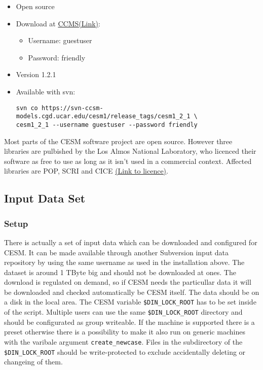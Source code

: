 \documentclass[]{article}
\providecommand{\tightlist}{%
  \setlength{\itemsep}{0pt}\setlength{\parskip}{0pt}}
\begin{document}
\begin{itemize}
\item
  Open source
\item
  Download at
  \href{http://www.cesm.ucar.edu/models/cesm1.2/cesm/doc/usersguide/x290.html\#download_ccsm_code}{CCMS(Link)}:

  \begin{itemize}
  \tightlist
  \item
    Username: guestuser
  \item
    Password: friendly
  \end{itemize}
\item
  Version 1.2.1
\item
  Available with svn:

\begin{verbatim}
svn co https://svn-ccsm-models.cgd.ucar.edu/cesm1/release_tags/cesm1_2_1 \
cesm1_2_1 --username guestuser --password friendly
\end{verbatim}
\end{itemize}

Most parts of the CESM software project are open source. However three
libraries are pulbished by the Los Almos National Laboratory, who
licenced their software as free to use as long as it isn't used in a
commercial context. Affected libraries are POP, SCRI and CICE
\href{http://www.cesm.ucar.edu/management/UofCAcopyright.ccsm3.html}{(Link
to licence)}.

\subsection{Input Data Set}\label{input-data-set}

\subsubsection{Setup}\label{setup}

There is actually a set of input data which can be downloaded and
configured for CESM. It can be made available through another Subversion
input data repository by using the same username as used in the
installation above. The dataset is around 1 TByte big and should not be
downloaded at ones. The download is regulated on demand, so if CESM
needs the particullar data it will be downloaded and checked
automatically be CESM itself. The data should be on a disk in the local
area. The CESM variable \texttt{\$DIN\_LOCK\_ROOT} has to be set inside
of the script. Multiple users can use the same
\texttt{\$DIN\_LOCK\_ROOT} directory and should be configurated as group
writeable. If the machine is supported there is a preset otherwise there
is a possibility to make it also run on generic machines with the
varibale argument \texttt{create\_newcase}. Files in the subdirectory of
the \texttt{\$DIN\_LOCK\_ROOT} should be write-protected to exclude
accidentally deleting or changeing of them.
\end{document}
